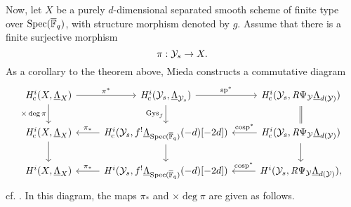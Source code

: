 \documentclass[../main.tex]{subfiles}
\begin{document}
Now, let $X$ be a purely $d$-dimensional separated smooth scheme of finite type
over $\operatorname{Spec}({\overline {\mathbb{F}}_q})$, with structure morphism denoted by $g$. Assume that there is a
finite surjective morphism
\begin{equation*}
  \pi: \mathcal{Y}_s \to X.
\end{equation*}
As a corollary to the theorem above, Mieda constructs a commutative diagram
\begin{equation}\label{eq:MiedasCommutingDiagram}
\begin{tikzcd}[ampersand replacement=\&]
  {\hHc^i(X, \underline \Lambda_X)} \& {\hHc^i(\cY_s, \underline
  \Lambda_{\cY_s})} \& {\hHc^i(\cY_s, \derR \Psi_\cY \underline
    \Lambda_{d(\cY)})} \\
  {\hHc^i(X, \underline \Lambda_{X})} \& {\hHc^i(\cY_s, f^! \underline
  \Lambda_{\spec(\Fqbar)}(-d)[-2d])} \& {\hHc^i(\cY_s, \derR \Psi_\cY
  \underline \Lambda_{d(\cY)})} \\
  {\hH^i(X, \underline \Lambda_{X})} \& {\hH^i(\cY_s, f^! \underline
  \Lambda_{\spec(\Fqbar)}(-d)[-2d])} \& {\hH^i(\cY_s, \derR \Psi_\cY \underline
  \Lambda_{d(\cY)}),}
	\arrow["{\pi^*}", from=1-1, to=1-2]
	\arrow["{\times \deg\pi}"', from=1-1, to=2-1]
	\arrow["{\specmap^*}", from=1-2, to=1-3]
	\arrow["{\Gys_f}"', from=1-2, to=2-2]
	\arrow[Rightarrow, no head, from=1-3, to=2-3]
	\arrow[from=2-1, to=3-1]
	\arrow["{\pi_*}"', from=2-2, to=2-1]
	\arrow[from=2-2, to=3-2]
	\arrow["{\cospecmap^*}"', from=2-3, to=2-2]
	\arrow[from=2-3, to=3-3]
	\arrow["{\pi_*}"', from=3-2, to=3-1]
	\arrow["{\cospecmap^*}"', from=3-3, to=3-2]
\end{tikzcd}
\end{equation}
cf. \cite[Corollary 2.7]{mieda2016geometric}.
In this diagram, the maps $\pi_*$ and $\times \deg \pi$ are given as follows.
\end{document}
